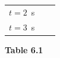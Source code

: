 {\begin{center}
\begin{xtabular*}{\mytablewidth}[t]{|p{10\mystarwidth}|p{10\mystarwidth}|p{10\mystarwidth}|}
    
     \tabularnewline{}
    
    
        \begin{math}t=2\end{math}~s &
    
    
         &
    
    
     \tabularnewline{}
    
    
        \begin{math}t=3\end{math}~s &
    
    
         &
    
    
     \tabularnewline{}
    \end{xtabular*}
      \end{center}
    \begin{center}{\small\bfseries Table 6.1}\end{center}
    
    \addtocounter{footnote}{-0}
    
        }%
      
